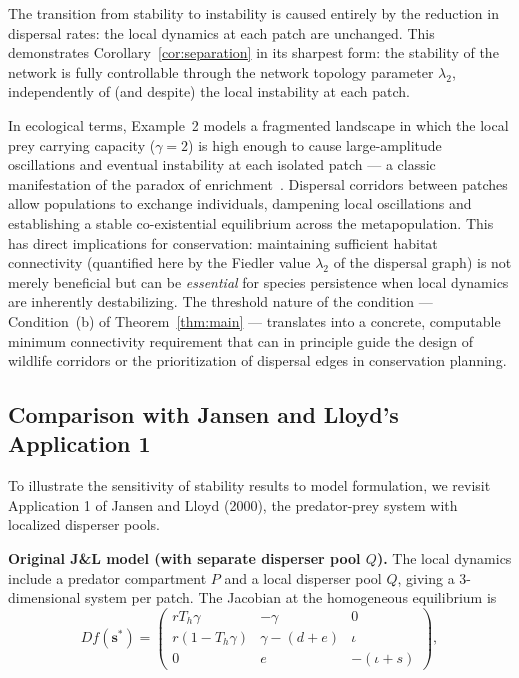 \documentclass[12pt,a4paper]{article}
\theoremstyle{definition}
\begin{document}
The transition from stability to instability is caused entirely by
the reduction in dispersal rates: the local dynamics at each patch
are unchanged.
This demonstrates Corollary~\ref{cor:separation} in its sharpest
form: the stability of the network is fully controllable through the
network topology parameter $\lambda_2$, independently of (and despite)
the local instability at each patch.



In ecological terms, Example~2 models a fragmented landscape in
which the local prey carrying capacity ($\gamma = 2$) is high enough
to cause large-amplitude oscillations and eventual instability at
each isolated patch --- a classic manifestation of the paradox of
enrichment~\cite{rosenzweig1971}.
Dispersal corridors between patches allow populations to exchange
individuals, dampening local oscillations and establishing a stable
co-existential equilibrium across the metapopulation.
This has direct implications for conservation: maintaining sufficient
habitat connectivity (quantified here by the Fiedler value $\lambda_2$
of the dispersal graph) is not merely beneficial but can be
\emph{essential} for species persistence when local dynamics are
inherently destabilizing.
The threshold nature of the condition --- Condition~(b) of
Theorem~\ref{thm:main} --- translates into a concrete, computable
minimum connectivity requirement that can in principle guide the
design of wildlife corridors or the prioritization of dispersal edges
in conservation planning.

\subsection*{Comparison with Jansen and Lloyd's Application 1}

To illustrate the sensitivity of stability results to model formulation, we revisit Application 1 of Jansen and Lloyd (2000), the predator-prey system with localized disperser pools.

\textbf{Original J\&L model (with separate disperser pool \(Q\)).}
The local dynamics include a predator compartment \(P\) and a local disperser pool \(Q\), giving a 3-dimensional system per patch. The Jacobian at the homogeneous equilibrium is
\[
Df(\mathbf{s}^*) = \begin{pmatrix}
r T_h \gamma & -\gamma & 0 \\
r(1-T_h\gamma) & \gamma-(d+e) & \iota \\
0 & e & -(\iota+s)
\end{pmatrix},
\]
\end{document}
